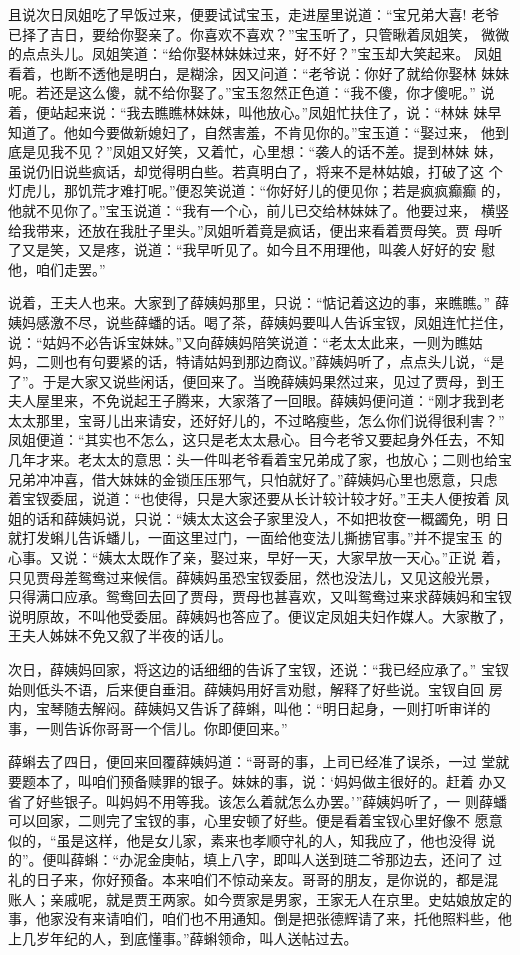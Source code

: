 且说次日凤姐吃了早饭过来，便要试试宝玉，走进屋里说道：“宝兄弟大喜!
老爷已择了吉日，要给你娶亲了。你喜欢不喜欢？”宝玉听了，只管瞅着凤姐笑，
微微的点点头儿。凤姐笑道：“给你娶林妹妹过来，好不好？”宝玉却大笑起来。
凤姐看着，也断不透他是明白，是糊涂，因又问道：“老爷说：你好了就给你娶林
妹妹呢。若还是这么傻，就不给你娶了。”宝玉忽然正色道：“我不傻，你才傻呢。”
说着，便站起来说：“我去瞧瞧林妹妹，叫他放心。”凤姐忙扶住了，说：“林妹
妹早知道了。他如今要做新媳妇了，自然害羞，不肯见你的。”宝玉道：“娶过来，
他到底是见我不见？”凤姐又好笑，又着忙，心里想：“袭人的话不差。提到林妹
妹，虽说仍旧说些疯话，却觉得明白些。若真明白了，将来不是林姑娘，打破了这
个灯虎儿，那饥荒才难打呢。”便忍笑说道：“你好好儿的便见你；若是疯疯癫癫
的，他就不见你了。”宝玉说道：“我有一个心，前儿已交给林妹妹了。他要过来，
横竖给我带来，还放在我肚子里头。”凤姐听着竟是疯话，便出来看着贾母笑。贾
母听了又是笑，又是疼，说道：“我早听见了。如今且不用理他，叫袭人好好的安
慰他，咱们走罢。”

说着，王夫人也来。大家到了薛姨妈那里，只说：“惦记着这边的事，来瞧瞧。”
薛姨妈感激不尽，说些薛蟠的话。喝了茶，薛姨妈要叫人告诉宝钗，凤姐连忙拦住，
说：“姑妈不必告诉宝妹妹。”又向薛姨妈陪笑说道：“老太太此来，一则为瞧姑
妈，二则也有句要紧的话，特请姑妈到那边商议。”薛姨妈听了，点点头儿说，“是
了”。于是大家又说些闲话，便回来了。当晚薛姨妈果然过来，见过了贾母，到王
夫人屋里来，不免说起王子腾来，大家落了一回眼。薛姨妈便问道：“刚才我到老
太太那里，宝哥儿出来请安，还好好儿的，不过略瘦些，怎么你们说得很利害？”
凤姐便道：“其实也不怎么，这只是老太太悬心。目今老爷又要起身外任去，不知
几年才来。老太太的意思：头一件叫老爷看着宝兄弟成了家，也放心；二则也给宝
兄弟冲冲喜，借大妹妹的金锁压压邪气，只怕就好了。”薛姨妈心里也愿意，只虑
着宝钗委屈，说道：“也使得，只是大家还要从长计较计较才好。”王夫人便按着
凤姐的话和薛姨妈说，只说：“姨太太这会子家里没人，不如把妆奁一概蠲免，明
日就打发蝌儿告诉蟠儿，一面这里过门，一面给他变法儿撕掳官事。”并不提宝玉
的心事。又说：“姨太太既作了亲，娶过来，早好一天，大家早放一天心。”正说
着，只见贾母差鸳鸯过来候信。薛姨妈虽恐宝钗委屈，然也没法儿，又见这般光景，
只得满口应承。鸳鸯回去回了贾母，贾母也甚喜欢，又叫鸳鸯过来求薛姨妈和宝钗
说明原故，不叫他受委屈。薛姨妈也答应了。便议定凤姐夫妇作媒人。大家散了，
王夫人姊妹不免又叙了半夜的话儿。

次日，薛姨妈回家，将这边的话细细的告诉了宝钗，还说：“我已经应承了。”
宝钗始则低头不语，后来便自垂泪。薛姨妈用好言劝慰，解释了好些说。宝钗自回
房内，宝琴随去解闷。薛姨妈又告诉了薛蝌，叫他：“明日起身，一则打听审详的
事，一则告诉你哥哥一个信儿。你即便回来。”

薛蝌去了四日，便回来回覆薛姨妈道：“哥哥的事，上司已经准了误杀，一过
堂就要题本了，叫咱们预备赎罪的银子。妹妹的事，说：‘妈妈做主很好的。赶着
办又省了好些银子。叫妈妈不用等我。该怎么着就怎么办罢。’”薛姨妈听了，一
则薛蟠可以回家，二则完了宝钗的事，心里安顿了好些。便是看着宝钗心里好像不
愿意似的，“虽是这样，他是女儿家，素来也孝顺守礼的人，知我应了，他也没得
说的”。便叫薛蝌：“办泥金庚帖，填上八字，即叫人送到琏二爷那边去，还问了
过礼的日子来，你好预备。本来咱们不惊动亲友。哥哥的朋友，是你说的，都是混
账人；亲戚呢，就是贾王两家。如今贾家是男家，王家无人在京里。史姑娘放定的
事，他家没有来请咱们，咱们也不用通知。倒是把张德辉请了来，托他照料些，他
上几岁年纪的人，到底懂事。”薛蝌领命，叫人送帖过去。

